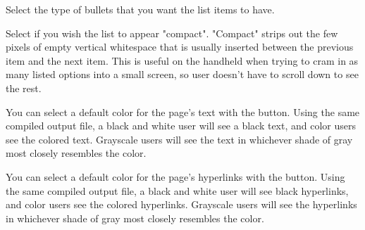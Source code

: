 
 Select the type of bullets that you want 
the list items to have. \notimplemented

 Select if you wish the list to appear 
"compact". "Compact" strips out the few pixels of empty vertical whitespace 
that is usually inserted between the previous item and the next item. This is 
useful on the handheld when trying to cram in as many listed options into a
small screen, so user doesn't have to scroll down to see the rest. 
\notimplemented


 You can select a default color for the 
page's text with the  button. Using the same 
compiled output file, a black and white user will see a black text, and 
color users see the colored text. Grayscale users will see the text in 
whichever shade of gray most closely resembles the color.

 You can select a default color for the 
page's hyperlinks with the  button. Using the 
same compiled output file, a black and white user will see black 
hyperlinks, and color users see the colored hyperlinks. Grayscale users will 
see the hyperlinks in whichever shade of gray most closely resembles the 
color.



